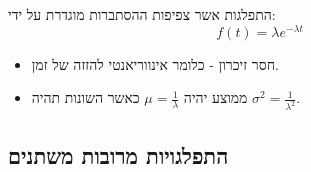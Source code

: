 \documentclass{tstextbook}
\begin{document}
\begin{definition}
התפלגות אשר צפיפות ההסתברות מוגדרת על ידי:
$$f(t)=\lambda e^{-\lambda t}$$

\end{definition}
\begin{proposition}
  \begin{itemize}
    \item חסר זיכרון - כלומר אינווריאנטי להזזה של זמן.
    \item ממוצע יהיה \(\mu =\frac{1}{\lambda}\) כאשר השונות תהיה \(\sigma^{2}=\frac{1}{\lambda^{2}}\).
  \end{itemize}
\end{proposition}
\begin{definition}
\end{definition}
\subsection{התפלגויות מרובות משתנים}
\end{document}
